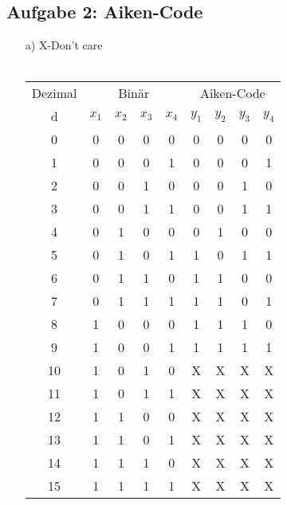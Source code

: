 \documentclass{article}
\begin{document}
    \subsection*{Aufgabe 2: Aiken-Code}
    \begin{itemize}
    	\item[a)]X-Don't care\\\\
    	\begin{tabular}[t]{c|cccc|cccc}
    		Dezimal &   \multicolumn{4}{c}{Binär}   & \multicolumn{4}{c}{Aiken-Code} \\
    		d       & $x_1$ & $x_2$ & $x_3$ & $x_4$ & $y_1$ & $y_2$ & $y_3$ & $y_4$  \\ \hline
    		0       & 0     & 0     & 0     & 0     & 0     & 0     & 0     & 0      \\
    		1       & 0     & 0     & 0     & 1     & 0     & 0     & 0     & 1      \\
    		2       & 0     & 0     & 1     & 0     & 0     & 0     & 1     & 0      \\
    		3       & 0     & 0     & 1     & 1     & 0     & 0     & 1     & 1      \\
    		4       & 0     & 1     & 0     & 0     & 0     & 1     & 0     & 0      \\
    		5       & 0     & 1     & 0     & 1     & 1     & 0     & 1     & 1      \\
    		6       & 0     & 1     & 1     & 0     & 1     & 1     & 0     & 0      \\
    		7       & 0     & 1     & 1     & 1     & 1     & 1     & 0     & 1      \\
    		8       & 1     & 0     & 0     & 0     & 1     & 1     & 1     & 0      \\
    		9       & 1     & 0     & 0     & 1     & 1     & 1     & 1     & 1      \\
    		10      & 1     & 0     & 1     & 0     & X     & X     & X     & X      \\
    		11      & 1     & 0     & 1     & 1     & X     & X     & X     & X      \\
    		12      & 1     & 1     & 0     & 0     & X     & X     & X     & X      \\
    		13      & 1     & 1     & 0     & 1     & X     & X     & X     & X      \\
    		14      & 1     & 1     & 1     & 0     & X     & X     & X     & X      \\
    		15      & 1     & 1     & 1     & 1     & X     & X     & X     & X

\end{tabular}
\end{itemize}
\end{document}

